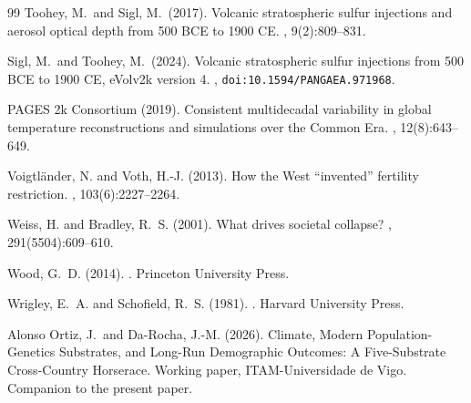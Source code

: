 \documentclass[11pt,letterpaper]{article}
\begin{document}
\begin{thebibliography}{99}
Toohey, M.\ and Sigl, M.\ (2017).
\newblock Volcanic stratospheric sulfur injections and aerosol optical depth from 500 {BCE} to 1900 {CE}.
, 9(2):809--831.

Sigl, M.\ and Toohey, M.\ (2024).
\newblock Volcanic stratospheric sulfur injections from 500 BCE to 1900 CE, eVolv2k version 4.
, \texttt{doi:10.1594/PANGAEA.971968}.

PAGES 2k Consortium (2019).
\newblock Consistent multidecadal variability in global temperature reconstructions and simulations over the {Common Era}.
, 12(8):643--649.

Voigtländer, N. and Voth, H.-J. (2013).
\newblock How the West ``invented'' fertility restriction.
, 103(6):2227--2264.

Weiss, H. and Bradley, R.~S. (2001).
\newblock What drives societal collapse?
, 291(5504):609--610.

Wood, G.~D. (2014).
.
\newblock Princeton University Press.

Wrigley, E.~A. and Schofield, R.~S. (1981).
.
\newblock Harvard University Press.

Alonso Ortiz, J.\ and Da-Rocha, J.-M. (2026).
\newblock Climate, Modern Population-Genetics Substrates, and Long-Run Demographic Outcomes: A Five-Substrate Cross-Country Horserace.
\newblock Working paper, ITAM-Universidade de Vigo. Companion to the present paper.

\end{thebibliography}
\end{document}
